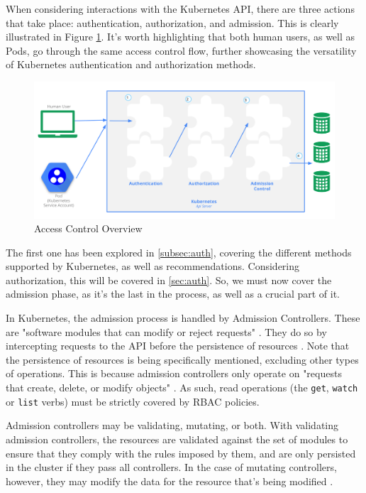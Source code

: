\documentclass[a4paper,11pt,openright,BCOR=15mm]{scrbook}
\begin{document}
When considering interactions with the Kubernetes API, there are three actions that take place: authentication, authorization, and admission. This is clearly illustrated in Figure \ref{fig:authflow}. It's worth highlighting that both human users, as well as Pods, go through the same access control flow, further showcasing the versatility of Kubernetes authentication and authorization methods.

\begin{figure}[h!]
	\centering
	\label{fig:authflow}
	\includegraphics[scale=0.3]{figs/access-control-overview.png}
	\caption{Access Control Overview \cite{the_linux_foundation_controlling_2023}}
\end{figure}


The first one has been explored in \ref{subsec:auth}, covering the different methods supported by Kubernetes, as well as recommendations. Considering authorization, this will be covered in \ref{sec:auth}. So, we must now cover the admission phase, as it's the last in the process, as well as a crucial part of it.

In Kubernetes, the admission process is handled by Admission Controllers. These are "software modules that can modify or reject requests" \cite{the_linux_foundation_controlling_2023}. They do so by intercepting requests to the API before the persistence of resources \cite{the_linux_foundation_admission_2024}. Note that the persistence of resources is being specifically mentioned, excluding other types of operations. This is because admission controllers only operate on "requests that create, delete, or modify objects" \cite{the_linux_foundation_admission_2024}. As such, read operations (the \texttt{get}, \texttt{watch} or \texttt{list} verbs) must be strictly covered by RBAC policies.

Admission controllers may be validating, mutating, or both. With validating admission controllers, the resources are validated against the set of modules to ensure that they comply with the rules imposed by them, and are only persisted in the cluster if they pass all controllers. In the case of mutating controllers, however, they may modify the data for the resource that's being modified \cite{the_linux_foundation_admission_2024}.
\end{document}
